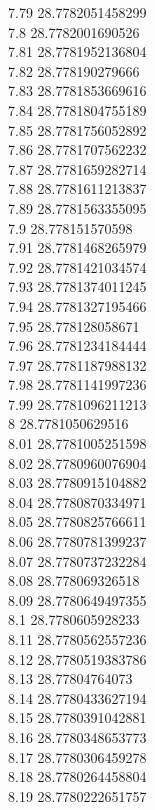 {7.79	28.7782051458299\\
7.8	28.7782001690526\\
7.81	28.7781952136804\\
7.82	28.778190279666\\
7.83	28.7781853669616\\
7.84	28.7781804755189\\
7.85	28.7781756052892\\
7.86	28.7781707562232\\
7.87	28.7781659282714\\
7.88	28.7781611213837\\
7.89	28.7781563355095\\
7.9	28.778151570598\\
7.91	28.7781468265979\\
7.92	28.7781421034574\\
7.93	28.7781374011245\\
7.94	28.7781327195466\\
7.95	28.778128058671\\
7.96	28.7781234184444\\
7.97	28.7781187988132\\
7.98	28.7781141997236\\
7.99	28.7781096211213\\
8	28.7781050629516\\
8.01	28.7781005251598\\
8.02	28.7780960076904\\
8.03	28.7780915104882\\
8.04	28.7780870334971\\
8.05	28.7780825766611\\
8.06	28.7780781399237\\
8.07	28.7780737232284\\
8.08	28.778069326518\\
8.09	28.7780649497355\\
8.1	28.7780605928233\\
8.11	28.7780562557236\\
8.12	28.7780519383786\\
8.13	28.77804764073\\
8.14	28.7780433627194\\
8.15	28.7780391042881\\
8.16	28.7780348653773\\
8.17	28.7780306459278\\
8.18	28.7780264458804\\
8.19	28.7780222651757\\
}
